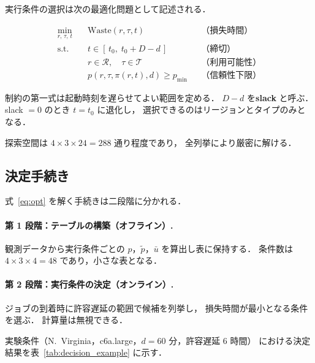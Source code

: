 \documentclass[11pt,a4paper]{ltjsreport}
\newcommand{\Waste}{\mathrm{Waste}}
\begin{document}
実行条件の選択は次の最適化問題として記述される．

\begin{equation}
\begin{aligned}
\min_{r,\,\tau,\,t}\quad
  & \Waste(r,\tau,t) && \text{（損失時間）} \\[3pt]
\text{s.t.}\quad
  & t \in [\,t_0,\; t_0 + D - d\,] && \text{（締切）} \\[2pt]
  & r \in \mathcal{R},\quad \tau \in \mathcal{T} && \text{（利用可能性）} \\[2pt]
  & p(r,\tau,\pi(r,t),d) \geq p_{\min} && \text{（信頼性下限）}
\end{aligned}
\label{eq:opt}
\end{equation}

制約の第一式は起動時刻を遅らせてよい範囲を定める．
$D - d$ を\textbf{slack} と呼ぶ．
slack $= 0$ のとき $t = t_0$ に退化し，
選択できるのはリージョンとタイプのみとなる．

探索空間は $4 \times 3 \times 24 = 288$ 通り程度であり，
全列挙により厳密に解ける．

\subsection{決定手続き}
\label{sec:procedure}

式~\eqref{eq:opt} を解く手続きは二段階に分かれる．

\paragraph{第 1 段階：テーブルの構築（オフライン）.}
観測データから実行条件ごとの
$p$，$\tilde p$，$\bar u$ を算出し表に保持する．
条件数は $4 \times 3 \times 4 = 48$ であり，小さな表となる．

\paragraph{第 2 段階：実行条件の決定（オンライン）.}
ジョブの到着時に許容遅延の範囲で候補を列挙し，
損失時間が最小となる条件を選ぶ．
計算量は無視できる．

実験条件（N.~Virginia，c6a.large，$d = 60$ 分，許容遅延 6 時間）
における決定結果を表~\ref{tab:decision_example} に示す．
\end{document}
